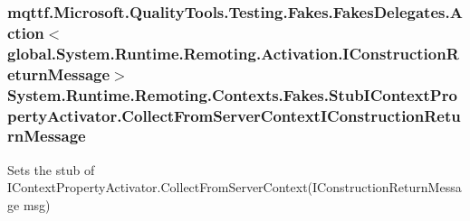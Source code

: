 \hypertarget{class_system_1_1_runtime_1_1_remoting_1_1_contexts_1_1_fakes_1_1_stub_i_context_property_activator_a217152914c3b48184299cfd1fa174d9f}{
\subsubsection[{Collect\-From\-Server\-Context\-I\-Construction\-Return\-Message}]{\setlength{\rightskip}{0pt plus 5cm}mqttf.\-Microsoft.\-Quality\-Tools.\-Testing.\-Fakes.\-Fakes\-Delegates.\-Action$<$global.\-System.\-Runtime.\-Remoting.\-Activation.\-I\-Construction\-Return\-Message$>$ System.\-Runtime.\-Remoting.\-Contexts.\-Fakes.\-Stub\-I\-Context\-Property\-Activator.\-Collect\-From\-Server\-Context\-I\-Construction\-Return\-Message}}\label{class_system_1_1_runtime_1_1_remoting_1_1_contexts_1_1_fakes_1_1_stub_i_context_property_activator_a217152914c3b48184299cfd1fa174d9f}


Sets the stub of I\-Context\-Property\-Activator.\-Collect\-From\-Server\-Context(\-I\-Construction\-Return\-Message msg)

